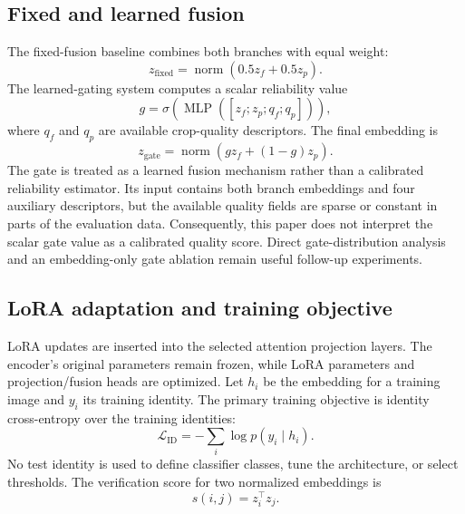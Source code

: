 ﻿\documentclass[10pt,journal,compsoc]{IEEEtran}
\begin{document}
\subsection{Fixed and learned fusion}
The fixed-fusion baseline combines both branches with equal weight:
\begin{equation}
 z_{\mathrm{fixed}}=\operatorname{norm}(0.5z_f+0.5z_p).
\end{equation}
The learned-gating system computes a scalar reliability value
\begin{equation}
 g=\sigma\left(\operatorname{MLP}([z_f;z_p;q_f;q_p])\right),
\end{equation}
where $q_f$ and $q_p$ are available crop-quality descriptors. The final embedding is
\begin{equation}
 z_{\mathrm{gate}}=\operatorname{norm}(gz_f+(1-g)z_p).
\end{equation}
The gate is treated as a learned fusion mechanism rather than a calibrated reliability estimator. Its input contains both branch embeddings and four auxiliary descriptors, but the available quality fields are sparse or constant in parts of the evaluation data. Consequently, this paper does not interpret the scalar gate value as a calibrated quality score. Direct gate-distribution analysis and an embedding-only gate ablation remain useful follow-up experiments.

\subsection{LoRA adaptation and training objective}
LoRA updates are inserted into the selected attention projection layers. The encoder's original parameters remain frozen, while LoRA parameters and projection/fusion heads are optimized. Let $h_i$ be the embedding for a training image and $y_i$ its training identity. The primary training objective is identity cross-entropy over the training identities:
\begin{equation}
 \mathcal{L}_{\mathrm{ID}}=-\sum_i\log p(y_i\mid h_i).
\end{equation}
No test identity is used to define classifier classes, tune the architecture, or select thresholds. The verification score for two normalized embeddings is
\begin{equation}
 s(i,j)=z_i^\top z_j.
\end{equation}
\end{document}
